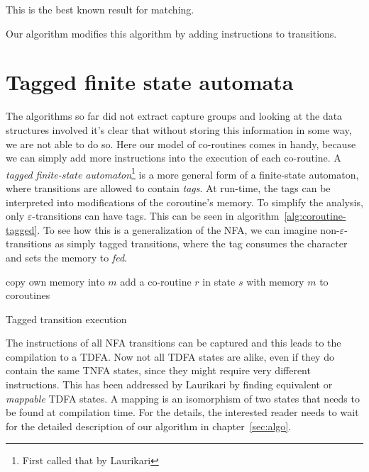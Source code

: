 \documentclass[11pt,a4paper,twoside,openright]{Thesis}
\theoremstyle{definition}
\newcommand{\seclabel}[1]{\label{sec:#1}}
\begin{document}
This is the best known result for matching\cite{Cox07a,Cox09a,Cox10a}.

Our algorithm modifies this algorithm by adding instructions to transitions.

\section{Tagged finite state automata}\seclabel{tfsa}
The algorithms so far did not extract capture groups and looking at the data 
structures involved it's clear that without storing this information in some 
way, we are not able to do so. Here our model of co-routines comes in 
handy, because we can simply add more instructions into the execution of each 
co-routine. A \emph{tagged finite-state automaton}\footnote{First called that by
Laurikari\cite{Laur00a}} is a more general form of a finite-state automaton,
where transitions are allowed to contain \emph{tags}. At run-time, the tags
can be interpreted into modifications of the coroutine's memory. To simplify
the analysis, only $\varepsilon$-transitions can have tags. This can be seen
in algorithm~\ref{alg:coroutine-tagged}. To see how this is a generalization
of the NFA, we can imagine non-$\varepsilon$-transitions as simply tagged
transitions, where the tag consumes the character and sets the memory to
\emph{fed}.

\begin{algorithm*}
  \begin{algorithmic}
        \State copy own memory into $m$
        \State {}
        \State add a co-routine $r$ in state $s$ with memory $m$ to coroutines
      \EndIf
    \EndFor
  \EndFunction
  \end{algorithmic}
  \caption{\label{alg:coroutine-tagged}Tagged transition execution}
\end{algorithm*}

The instructions of all NFA transitions can be captured and this leads to the 
compilation to a TDFA\@. Now not all TDFA states are alike, even if they do contain 
the same TNFA states, since they might require very different instructions. 
This has been addressed by Laurikari\cite{Laur00a} by finding equivalent or
\emph{mappable} TDFA states. A mapping is an isomorphism of two states that 
needs to be found at compilation time. For the details, the interested reader 
needs to wait for the detailed description of our algorithm in chapter~\ref{sec:algo}.
\end{document}
